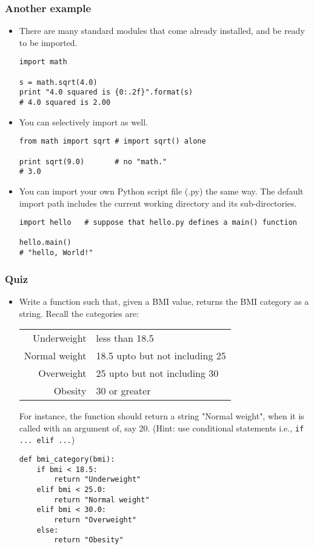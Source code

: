 \documentclass{beamer}
\begin{document}
\begin{frame}[fragile]
\frametitle{Another example}
\begin{itemize}
\item There are many standard modules that come
      already installed, and be ready to be imported.
\begin{lstlisting}[escapechar=\%]
import math

s = math.sqrt(4.0)
print "4.0 squared is {0:.2f}".format(s)
# 4.0 squared is 2.00
\end{lstlisting}
\item You can selectively import as well.
\begin{lstlisting}
from math import sqrt # import sqrt() alone

print sqrt(9.0)       # no "math."
# 3.0
\end{lstlisting}
\item You can import your own Python script file (.py)
      the same way. The default import path includes
      the current working directory and its sub-directories.
\begin{lstlisting}
import hello   # suppose that hello.py defines a main() function

hello.main()
# "hello, World!"
\end{lstlisting}
\end{itemize}
\end{frame}

\begin{frame}[fragile]
\frametitle{Quiz}
\begin{itemize}
\item Write a function such that, given a BMI value, 
    returns the BMI category as a string. Recall the
    categories are:
{\tiny
\begin{table}[h]
\begin{tabular}{r l}
Underweight & less than 18.5 \\ 
Normal weight & 18.5 upto but not including 25 \\
Overweight & 25 upto but not including 30 \\
Obesity & 30 or greater \\
\end{tabular}
\end{table}
}
For instance, the function should return a string 
"Normal weight", when it is called with an argument
of, say 20. (Hint: use conditional statements 
i.e., \lstinline{if ... elif ...})
\begin{lstlisting}
def bmi_category(bmi):
    if bmi < 18.5:
        return "Underweight"
    elif bmi < 25.0:
        return "Normal weight"
    elif bmi < 30.0:
        return "Overweight"
    else:
        return "Obesity"
\end{lstlisting} 
\end{itemize}
\end{frame}
\end{document}
